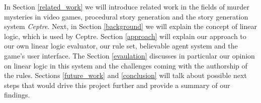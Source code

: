 In Section \ref{related_work} we will introduce related work in the fields of murder mysteries in video games, procedural story generation and the story generation system \emph{Ceptre}.
Next, in Section \ref{background} we will explain the concept of linear logic, which is used by Ceptre.
Section \ref{approach} will explain our approach to our own linear logic evaluator, our rule set, believable agent system and the game's user interface.
The Section \ref{evaulation} discusses in particular our opinion on linear logic in this system and the challenges coming with the authorship of the rules.
Sections \ref{future_work} and \ref{conclusion} will talk about possible next steps that would drive this project further and provide a summary of our findings.
